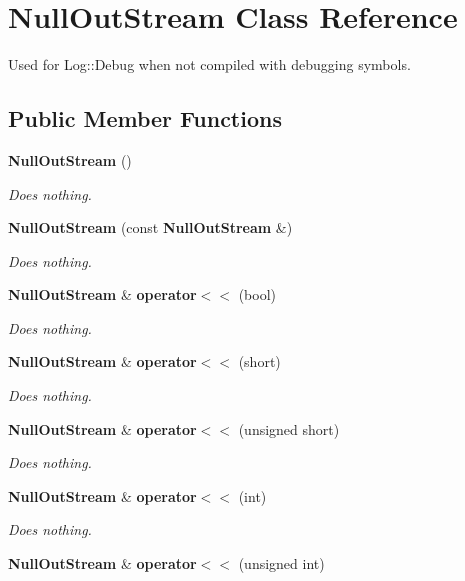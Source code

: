 \section{Null\+Out\+Stream Class Reference}
\label{classmlpack_1_1util_1_1NullOutStream}


Used for Log\+::\+Debug when not compiled with debugging symbols.  


\subsection*{Public Member Functions}
\begin{DoxyCompactItemize}
\item 
\textbf{ Null\+Out\+Stream} ()
\begin{DoxyCompactList}\small\item\em Does nothing. \end{DoxyCompactList}\item 
\textbf{ Null\+Out\+Stream} (const \textbf{ Null\+Out\+Stream} \&)
\begin{DoxyCompactList}\small\item\em Does nothing. \end{DoxyCompactList}\item 
\textbf{ Null\+Out\+Stream} \& \textbf{ operator$<$$<$} (bool)
\begin{DoxyCompactList}\small\item\em Does nothing. \end{DoxyCompactList}\item 
\textbf{ Null\+Out\+Stream} \& \textbf{ operator$<$$<$} (short)
\begin{DoxyCompactList}\small\item\em Does nothing. \end{DoxyCompactList}\item 
\textbf{ Null\+Out\+Stream} \& \textbf{ operator$<$$<$} (unsigned short)
\begin{DoxyCompactList}\small\item\em Does nothing. \end{DoxyCompactList}\item 
\textbf{ Null\+Out\+Stream} \& \textbf{ operator$<$$<$} (int)
\begin{DoxyCompactList}\small\item\em Does nothing. \end{DoxyCompactList}\item 
\textbf{ Null\+Out\+Stream} \& \textbf{ operator$<$$<$} (unsigned int)

\end{DoxyCompactItemize}

